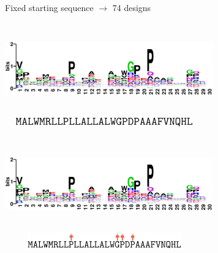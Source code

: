 \documentclass{beamer}
\begin{document}
\begin{frame}
\centering
Fixed starting sequence $\rightarrow$ 74 designs\\
\begin{adjustwidth}{-1.5em}{-2.5em}
\includegraphics[width=340px,height=150px]{../img/logo.png}\\ 
\vspace{10px}
\hspace{18px}\includegraphics[width=325px,height=15px]{../img/sequence.png}
\end{adjustwidth}
\end{frame}

\begin{frame}
\begin{adjustwidth}{-1.5em}{-2.5em}
\includegraphics[width=340px,height=150px]{../img/logo.png}\\ 
\hspace{18px}\includegraphics[width=325px,height=25px]{../img/sequence2.png}
\end{adjustwidth}
\end{frame}
\end{document}
